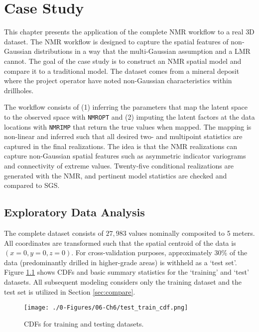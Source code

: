 
\chapter{Case Study}
\label{ch:casestudy}

This chapter presents the application of the complete \gls{NMR} workflow to a real \gls{3D} dataset. The \gls{NMR} workflow is designed to capture the spatial features of non‐Gaussian distributions in a way that the multi-Gaussian assumption and a \gls{LMR} cannot. The goal of the case study is to construct an \gls{NMR} spatial model and compare it to a traditional model. The dataset comes from a mineral deposit where the project operator have noted non-Gaussian characteristics within drillholes.

The workflow consists of (1) inferring the parameters that map the latent space to the observed space with \texttt{NMROPT} and (2) imputing the latent factors at the data locations with \texttt{NMRIMP} that return the true values when mapped. The mapping is non-linear and inferred such that all desired two- and multipoint statistics are captured in the final realizations. The idea is that the \gls{NMR} realizations can capture non-Gaussian spatial features such as asymmetric indicator variograms and connectivity of extreme values. Twenty-five conditional realizations are generated with the \gls{NMR}, and pertinent model statistics are checked and compared to \gls{SGS}.

\section{Exploratory Data Analysis}
\label{sec:eda}

The complete dataset consists of $27,983$ values nominally composited to 5 meters. All coordinates are transformed such that the spatial centroid of the data is $(x=0,y=0,z=0)$. For cross-validation purposes, approximately 30\% of the data (predominantly drilled in higher-grade areas) is withheld as a `test set'. Figure \ref{fig:datasets} shows \glspl{CDF} and basic summary statistics for the `training' and `test' datasets. All subsequent modeling considers only the training dataset and the test set is utilized in Section \ref{sec:compare}.

\begin{figure}[htb!]
    \centering
    \texttt{[image: ./0-Figures/06-Ch6/test\_train\_cdf.png]}
    \caption{ \Glspl{CDF} for training and testing datasets. }
    \label{fig:datasets}
\end{figure}


